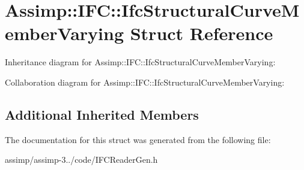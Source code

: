 \hypertarget{struct_assimp_1_1_i_f_c_1_1_ifc_structural_curve_member_varying}{\section{Assimp\+:\+:I\+F\+C\+:\+:Ifc\+Structural\+Curve\+Member\+Varying Struct Reference}
\label{struct_assimp_1_1_i_f_c_1_1_ifc_structural_curve_member_varying}
}


Inheritance diagram for Assimp\+:\+:I\+F\+C\+:\+:Ifc\+Structural\+Curve\+Member\+Varying\+:


Collaboration diagram for Assimp\+:\+:I\+F\+C\+:\+:Ifc\+Structural\+Curve\+Member\+Varying\+:
\subsection*{Additional Inherited Members}


The documentation for this struct was generated from the following file\+:\begin{DoxyCompactItemize}
\item 
assimp/assimp-\/3../code/I\+F\+C\+Reader\+Gen.\+h\end{DoxyCompactItemize}
